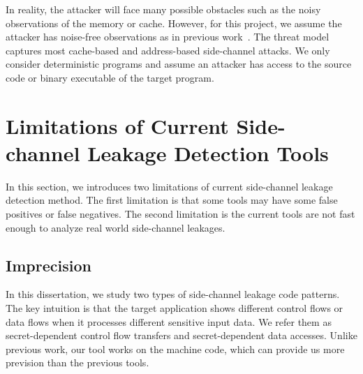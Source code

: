 In reality, the
attacker will face many possible obstacles such as the noisy observations of the memory or cache. However, for this project, we assume
the attacker has noise-free observations as in previous work~\cite{203878,182946,Brotzman19Casym}. 
The threat model captures most cache-based and address-based side-channel attacks. 
We only consider deterministic programs and assume an attacker has access to the source code or binary executable of the target program.

\section{Limitations of Current Side-channel Leakage Detection Tools}
In this section, we introduces two limitations of current side-channel leakage detection method. The first limitation is that some tools may have some false positives or false negatives. The second limitation is the current tools are not fast enough to analyze real world side-channel leakages.


\subsection{Imprecision}
In this dissertation, we study two types of side-channel leakage code patterns. The key intuition is that the target application shows different control flows or data flows when it processes different sensitive input data. We refer them as secret-dependent control flow transfers and secret-dependent data accesses. Unlike previous work, our tool works on the machine code, which can provide us more prevision than the previous tools.

